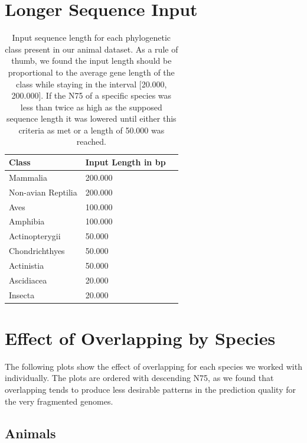 \documentclass{article}
\begin{document}
\section{Longer Sequence Input}
\label{sec:longer}
\begin{table}[!h]
\renewcommand\thetable{S5}
\centering
\begin{tabular}{@{}lll@{}}
\hline
Class & Input Length in bp\\ [0.5ex]
\hline
Mammalia & 200.000 \\
Non-avian Reptilia & 200.000 \\
Aves & 100.000 \\
Amphibia & 100.000 \\
Actinopterygii & 50.000 \\
Chondrichthyes & 50.000 \\
Actinistia & 50.000 \\
Ascidiacea & 20.000 \\
Insecta & 20.000 \\
\hline
\end{tabular}
\caption{Input sequence length for each phylogenetic class present in our animal dataset. As a rule of thumb, we found the input length should be proportional to the average gene length of the class while staying in the interval [20.000, 200.000]. If the N75 of a specific species was less than twice as high as the supposed sequence length it was lowered until either this criteria as met or a length of 50.000 was reached. }
\end{table}

\newpage
\section{Effect of Overlapping by Species}
\label{sec:overlapping}

The following plots show the effect of overlapping for each species we worked with individually. The plots are ordered with descending N75, as we found that overlapping tends to produce less desirable patterns in the prediction quality for the very fragmented genomes. 

\subsection{Animals}
\newpage
\end{document}
